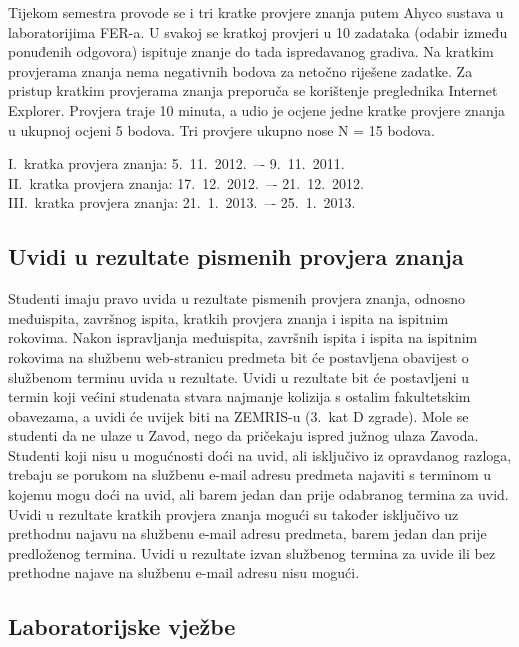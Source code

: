 \documentclass[times, 12pt, utf8]{book}
\begin{document}
Tijekom semestra provode se i tri kratke provjere znanja putem Ahyco sustava u laboratorijima FER-a.
U svakoj se kratkoj provjeri u 10 zadataka (odabir između ponuđenih odgovora) ispituje znanje do tada ispredavanog gradiva.
Na kratkim provjerama znanja nema negativnih bodova za netočno riješene zadatke.
Za pristup kratkim provjerama znanja preporuča se korištenje preglednika Internet Explorer.
Provjera traje 10 minuta, a udio je ocjene jedne kratke provjere znanja u ukupnoj ocjeni 5 bodova.
Tri provjere ukupno nose N = 15 bodova.


I.~kratka provjera znanja: 5.~11.~2012.~–- 9.~11.~2011. \\
II.~kratka provjera znanja: 17.~12.~2012.~–- 21.~12.~2012. \\
III.~kratka provjera znanja: 21.~1.~2013.~–- 25.~1.~2013.


\cleardoublepage  
{}  
{}
\subsection*{Uvidi u rezultate pismenih provjera znanja}

Studenti imaju pravo uvida u rezultate pismenih provjera znanja, odnosno međuispita, završnog ispita, kratkih provjera znanja i ispita na ispitnim rokovima.
Nakon ispravljanja međuispita, završnih ispita i ispita na ispitnim rokovima na službenu web-stranicu predmeta bit će postavljena obavijest o službenom terminu uvida u rezultate.
Uvidi u rezultate bit će postavljeni u termin koji većini studenata stvara najmanje kolizija s ostalim fakultetskim obavezama, a uvidi će uvijek biti na ZEMRIS-u (3.~kat D zgrade).
Mole se studenti da ne ulaze u Zavod, nego da pričekaju ispred južnog ulaza Zavoda.
Studenti koji nisu u mogućnosti doći na uvid, ali isključivo iz opravdanog razloga, trebaju se porukom na službenu e-mail adresu predmeta najaviti s terminom u kojemu mogu doći na uvid, ali barem jedan dan prije odabranog termina za uvid.
Uvidi u rezultate kratkih provjera znanja mogući su također isključivo uz prethodnu najavu na službenu e-mail adresu predmeta, barem jedan dan prije predloženog termina.
Uvidi u rezultate izvan službenog termina za uvide ili bez prethodne najave na službenu e-mail adresu nisu mogući.

\cleardoublepage  
{}  
{}
\subsection*{Laboratorijske vježbe}
\end{document}
